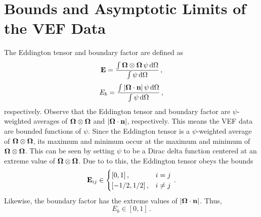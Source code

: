 \documentclass[../doc.tex]{subfiles}
\begin{document}
\section{Bounds and Asymptotic Limits of the VEF Data}
The Eddington tensor and boundary factor are defined as 
	\begin{equation}
		\boldsymbol{\mathrm{E}} = \frac{\int\boldsymbol{\Omega}\otimes\boldsymbol{\Omega}\,\psi \mathop{}\!\mathrm{d} \Omega}{\int \psi \mathop{}\!\mathrm{d} \Omega}\,,
	\end{equation}
	\begin{equation}
		E_b = \frac{\int|\boldsymbol{\Omega}\cdot\boldsymbol{\mathrm{n}}|\,\psi \mathop{}\!\mathrm{d} \Omega}{\int \psi \mathop{}\!\mathrm{d} \Omega} \,,
	\end{equation}
respectively. Observe that the Eddington tensor and boundary factor are $\psi$-weighted averages of $\boldsymbol{\Omega}\otimes\boldsymbol{\Omega}$ and $|\boldsymbol{\Omega}\cdot\boldsymbol{\mathrm{n}}|$, respectively. This means the VEF data are bounded functions of $\psi$. 
Since the Eddington tensor is a $\psi$-weighted average of $\boldsymbol{\Omega}\otimes\boldsymbol{\Omega}$, its maximum and minimum occur at the maximum and minimum of $\boldsymbol{\Omega}\otimes\boldsymbol{\Omega}$. This can be seen by setting $\psi$ to be a Dirac delta function centered at an extreme value of $\boldsymbol{\Omega}\otimes\boldsymbol{\Omega}$. Due to to this, the Eddington tensor obeys the bounds 
	\begin{equation}
		\boldsymbol{\mathrm{E}}_{ij} \in \begin{cases}
			[0,1] \,, & i=j \\ 
			[-1/2,1/2] \,, & i\neq j
		\end{cases} \,. 
	\end{equation}
Likewise, the boundary factor has the extreme values of $|\boldsymbol{\Omega}\cdot\boldsymbol{\mathrm{n}}|$. Thus, 
	\begin{equation}
		E_b \in [0,1] \,. 
	\end{equation}
\end{document}
